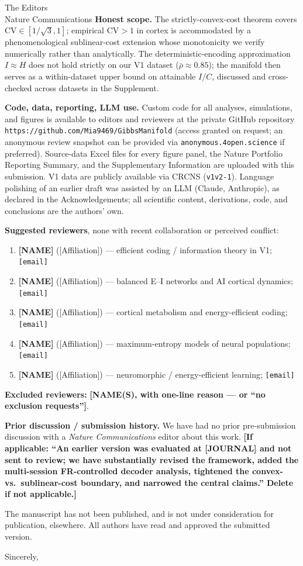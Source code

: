 \documentclass[11pt]{letter}
\begin{document}
\begin{letter}{The Editors\\Nature Communications}
\textbf{Honest scope.}
The strictly-convex-cost theorem covers $\mathrm{CV}\in[1/\sqrt{3},1]$; empirical $\mathrm{CV}>1$ in cortex is accommodated by a phenomenological sublinear-cost extension whose monotonicity we verify numerically rather than analytically.  The deterministic-encoding approximation $I\approx H$ does not hold strictly on our V1 dataset ($\bar\rho\approx 0.85$); the manifold then serves as a within-dataset upper bound on attainable $I/C$, discussed and cross-checked across datasets in the Supplement.

\textbf{Code, data, reporting, LLM use.}
Custom code for all analyses, simulations, and figures is available to editors and reviewers at the private GitHub repository \texttt{https://github.com/Mia9469/GibbsManifold} (access granted on request; an anonymous review snapshot can be provided via \texttt{anonymous.4open.science} if preferred).  Source-data Excel files for every figure panel, the Nature Portfolio Reporting Summary, and the Supplementary Information are uploaded with this submission.  V1 data are publicly available via CRCNS (\texttt{v1v2-1}).  Language polishing of an earlier draft was assisted by an LLM (Claude, Anthropic), as declared in the Acknowledgements; all scientific content, derivations, code, and conclusions are the authors' own.

\textbf{Suggested reviewers}, none with recent collaboration or perceived conflict:
\begin{enumerate}
\itemsep -3pt
\item \textbf{[NAME]} ([Affiliation]) --- efficient coding / information theory in V1; \texttt{[email]}
\item \textbf{[NAME]} ([Affiliation]) --- balanced E--I networks and AI cortical dynamics; \texttt{[email]}
\item \textbf{[NAME]} ([Affiliation]) --- cortical metabolism and energy-efficient coding; \texttt{[email]}
\item \textbf{[NAME]} ([Affiliation]) --- maximum-entropy models of neural populations; \texttt{[email]}
\item \textbf{[NAME]} ([Affiliation]) --- neuromorphic / energy-efficient learning; \texttt{[email]}
\end{enumerate}
\textbf{Excluded reviewers:} \textbf{[NAME(S), with one-line reason --- or ``no exclusion requests'']}.

\textbf{Prior discussion / submission history.}
We have had no prior pre-submission discussion with a \textit{Nature Communications} editor about this work.  \textbf{[If applicable: ``An earlier version was evaluated at [JOURNAL] and not sent to review; we have substantially revised the framework, added the multi-session FR-controlled decoder analysis, tightened the convex- vs.\ sublinear-cost boundary, and narrowed the central claims.''  Delete if not applicable.]}

The manuscript has not been published, and is not under consideration for publication, elsewhere.  All authors have read and approved the submitted version.

\closing{Sincerely,}

\end{letter}
\end{document}
